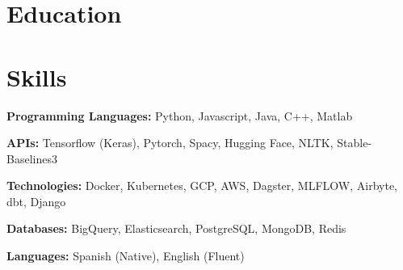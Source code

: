 \documentclass{ExpressiveResume}
\begin{document}


\section{Education}




\section{Skills}

 {\bf Programming Languages:} Python, Javascript, Java, C++, Matlab

    {\bf APIs:} Tensorflow (Keras), Pytorch, Spacy, Hugging Face, NLTK, Stable-Baselines3

{\bf Technologies:} Docker, Kubernetes, GCP, AWS, Dagster, MLFLOW,
Airbyte, dbt, Django

    {\bf Databases:} BigQuery, Elasticsearch, PostgreSQL, MongoDB, Redis

    {\bf Languages:} Spanish (Native), English (Fluent)
\end{document}
